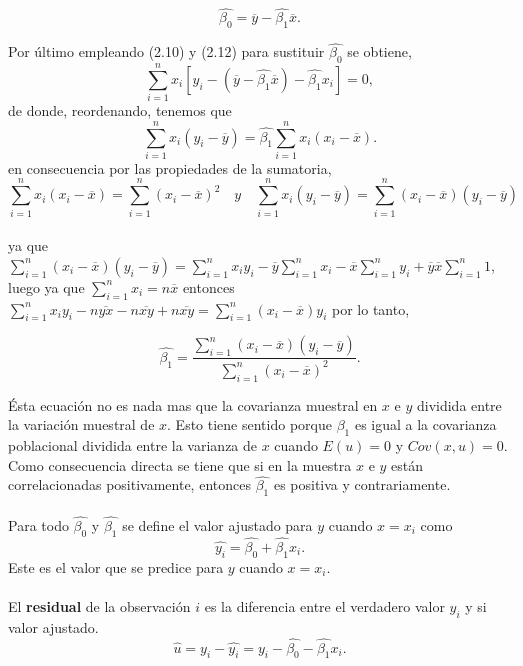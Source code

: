 \begin{tcolorbox}[colframe=white]
\begin{equation}
    \hat{\beta_0} = \overline{y} - \hat{\beta_1}\overline{x}.
\end{equation}
\end{tcolorbox}
Por último empleando (2.10) y (2.12) para sustituir $\hat{\beta_0}$ se obtiene,
$$\sum_{i=1}^n x_i\left[y_i-(\overline{y}-\hat{\beta_1}\overline{x})-\hat{\beta_1}x_i\right] = 0,$$
de donde, reordenando, tenemos que
$$\sum_{i=1}^n x_i(y_i-\overline{y}) = \hat{\beta_1}\sum_{i=1}^n x_i(x_i-\overline{x}).$$
en consecuencia por las propiedades de la sumatoria, 
$$\sum_{i=1}^n x_i(x_i-\overline{x}) = \sum_{i=1}^n (x_i-\overline{x})^2 \quad y \quad \sum_{i=1}^n x_i(y_i-\overline{y}) = \sum_{i=1}^n (x_i-\overline{x})(y_i-\overline{y})$$\\
ya que $\sum\limits_{i=1}^n (x_i-\overline{x})(y_i-\overline{y})=\sum\limits_{i=1}^n x_i y_i - \overline{y}\sum\limits_{i=1}^n x_i - \overline{x}\sum\limits_{i=1}^n y_i + \overline{y} \overline{x}\sum\limits_{i=1}^n 1 $, luego ya que $\sum\limits_{i=1}^n x_i = n\overline{x}$ entonces $\sum\limits_{i=1}^n x_iy_i - n\overline{yx} - n\overline{xy} + n\overline{xy} = \sum\limits_{i=1}^n (x_i-\overline{x})y_i$
por lo tanto, 
\begin{tcolorbox}[colframe=white]
\begin{equation}
    \hat{\beta_1} = \frac{\sum\limits_{i=1}^n (x_i-\overline{x})(y_i-\overline{y})}{\sum\limits_{i=1}^n (x_i-\overline{x})^2}.
\end{equation}
\end{tcolorbox}
Ésta ecuación no es nada mas que la covarianza muestral en $x$ e $y$ dividida entre la variación muestral de $x$. Esto tiene sentido porque $\beta_1$ es igual a la covarianza poblacional dividida entre la varianza de $x$ cuando $E(u)=0$ y $Cov(x,u) = 0$. Como consecuencia directa se tiene que si en la muestra $x$ e $y$ están correlacionadas positivamente, entonces $\hat{\beta_1}$ es positiva y contrariamente.\\\\
Para todo $\hat{\beta_0}$ y $\hat{\beta_1}$ se define el valor ajustado para $y$ cuando $x=x_i$ como 
\begin{equation}
	\hat{y_i} = \hat{\beta_0} + \hat{\beta_1}x_i.
\end{equation}
Este es el valor que se predice para $y$ cuando $x=x_i$.\\\\
El \textbf{residual} de la observación $i$ es la diferencia entre el verdadero valor $y_i$ y si valor ajustado.\begin{equation} 
    \hat{u} = y_i - \hat{y_i} = y_i - \hat{\beta_0} - \hat{\beta_1}x_i.
\end{equation}
